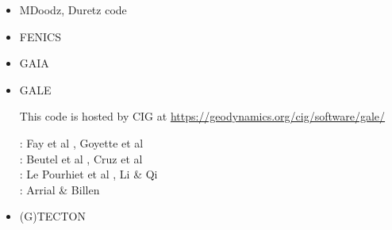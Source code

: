 \begin{itemize}
{\small
\cite{demh19}
}

\item {\codefont MDoodz}, Duretz code

{\small
\cite{yatd12}
\cite{yahb13}
\cite{yadm15}
\cite{dumy16}\cite{dupm16}
\cite{chmd19}\cite{dual19}\cite{pedm19}
\cite{poyd20}\cite{bedh20}
}

\item {\codefont FENICS} 

\cite{alrk14}

\item {\codefont GAIA} 

{\small
\noindent
\cite{toyu11}
\cite{hutm13}
\cite{plth13}
\cite{neum19}
}

\item {\codefont GALE} 

This code is hosted by CIG at \url{https://geodynamics.org/cig/software/gale/}

\begin{scriptsize}
\noindent
\twothousandeight:
Fay et al \cite{fabs08}, Goyette et al \cite{gotc08}\\
\twothousandten:
Beutel et al \cite{beve10}, Cruz et al \cite{crmw10}\\
\twothousandtwelve:
Le Pourhiet et al \cite{lehm12}, Li \& Qi \cite{liqi12}\\
\twothousandthirteen:
Arrial \& Billen \cite{arbi13}
\end{scriptsize}

\item {\codefont (G)TECTON}  


\end{itemize}

